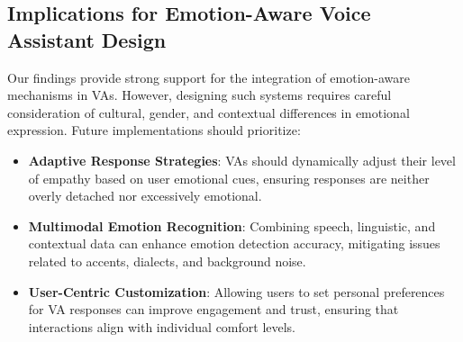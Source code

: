 \subsection{Implications for Emotion-Aware Voice Assistant Design}

Our findings provide strong support for the integration of emotion-aware mechanisms in VAs. However, designing such systems requires careful consideration of cultural, gender, and contextual differences in emotional expression. Future implementations should prioritize:

\begin{itemize}
    \item \textbf{Adaptive Response Strategies}: VAs should dynamically adjust their level of empathy based on user emotional cues, ensuring responses are neither overly detached nor excessively emotional.
    \item \textbf{Multimodal Emotion Recognition}: Combining speech, linguistic, and contextual data can enhance emotion detection accuracy, mitigating issues related to accents, dialects, and background noise.
    \item \textbf{User-Centric Customization}: Allowing users to set personal preferences for VA responses can improve engagement and trust, ensuring that interactions align with individual comfort levels.
\end{itemize}


